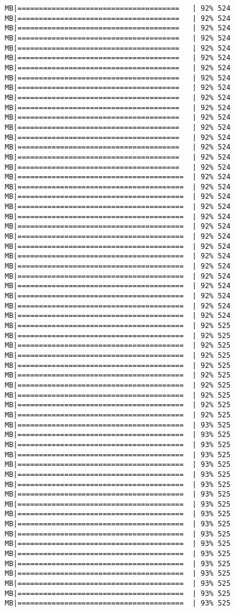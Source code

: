 \documentclass[
]{article}
\begin{document}
\begin{verbatim}
MB|======================================   | 92% 524 MB|======================================   | 92% 524 MB|======================================   | 92% 524 MB|======================================   | 92% 524 MB|======================================   | 92% 524 MB|======================================   | 92% 524 MB|======================================   | 92% 524 MB|======================================   | 92% 524 MB|======================================   | 92% 524 MB|======================================   | 92% 524 MB|======================================   | 92% 524 MB|======================================   | 92% 524 MB|======================================   | 92% 524 MB|======================================   | 92% 524 MB|======================================   | 92% 524 MB|======================================   | 92% 524 MB|======================================   | 92% 524 MB|=======================================  | 92% 524 MB|=======================================  | 92% 524 MB|=======================================  | 92% 524 MB|=======================================  | 92% 524 MB|=======================================  | 92% 524 MB|=======================================  | 92% 524 MB|=======================================  | 92% 524 MB|=======================================  | 92% 524 MB|=======================================  | 92% 524 MB|=======================================  | 92% 524 MB|=======================================  | 92% 524 MB|=======================================  | 92% 524 MB|=======================================  | 92% 524 MB|=======================================  | 92% 524 MB|=======================================  | 92% 524 MB|=======================================  | 92% 525 MB|=======================================  | 92% 525 MB|=======================================  | 92% 525 MB|=======================================  | 92% 525 MB|=======================================  | 92% 525 MB|=======================================  | 92% 525 MB|=======================================  | 92% 525 MB|=======================================  | 92% 525 MB|=======================================  | 92% 525 MB|=======================================  | 92% 525 MB|=======================================  | 93% 525 MB|=======================================  | 93% 525 MB|=======================================  | 93% 525 MB|=======================================  | 93% 525 MB|=======================================  | 93% 525 MB|=======================================  | 93% 525 MB|=======================================  | 93% 525 MB|=======================================  | 93% 525 MB|=======================================  | 93% 525 MB|=======================================  | 93% 525 MB|=======================================  | 93% 525 MB|=======================================  | 93% 525 MB|=======================================  | 93% 525 MB|=======================================  | 93% 525 MB|=======================================  | 93% 525 MB|=======================================  | 93% 525 MB|=======================================  | 93% 525 MB|=======================================  | 93% 525 MB|=======================================  | 93% 525 
\end{verbatim}
\end{document}
